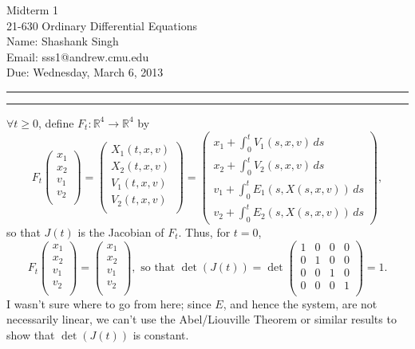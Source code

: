 \documentclass[11pt]{article}
\makeatletter
\newcounter{questionCounter}
\newcounter{partCounter}[questionCounter]
\newenvironment{question}[2][\arabic{questionCounter}]{%
    \setcounter{partCounter}{0}%
    \vspace{.25in} \hrule \vspace{0.5em}%
        \noindent{\bf #2}%
    \vspace{0.8em} \hrule \vspace{.10in}%
    \addtocounter{questionCounter}{1}%
}{}
\newcommand{\myname}{Shashank Singh}
\newcommand{\myandrew}{sss1@andrew.cmu.edu}
\newcommand{\myclass}{21-630 Ordinary Differential Equations}
\newcommand{\myhwnum}{1}
\newcommand{\duedate}{Wednesday, March 6, 2013}
\newcommand{\R}{\mathbb{R}} %
\makeatother
\begin{document}
\thispagestyle{plain}

{\Large Midterm \myhwnum} \\
\myclass \\
Name: \myname \\
Email: \myandrew \\
Due: \duedate

\begin{question}{Problem 1}
$\forall t \geq 0$, define $F_t : \R^4 \rightarrow \R^4$ by
\[F_t
    \begin{pmatrix}
        x_1 \\
        x_2 \\
        v_1 \\
        v_2 \\
    \end{pmatrix}
 =
    \begin{pmatrix}
        X_1(t,x,v) \\
        X_2(t,x,v) \\
        V_1(t,x,v) \\
        V_2(t,x,v) \\
    \end{pmatrix}
 =
    \begin{pmatrix}
x_1 + \int_0^t V_1(s,x,v) \, ds \\
x_2 + \int_0^t V_2(s,x,v) \, ds \\
v_1 + \int_0^t E_1(s,X(s,x,v)) \, ds \\
v_2 + \int_0^t E_2(s,X(s,x,v)) \, ds
    \end{pmatrix},
\]
so that $J(t)$ is the Jacobian of $F_t$. Thus, for $t = 0$,
\[
F_t
    \begin{pmatrix}
        x_1 \\
        x_2 \\
        v_1 \\
        v_2 \\
    \end{pmatrix}
 =
    \begin{pmatrix}
        x_1 \\
        x_2 \\
        v_1 \\
        v_2 \\
    \end{pmatrix},
\mbox{ so that }
\det(J(t)) = \det
    \begin{pmatrix}
        1 & 0 & 0 & 0 \\
        0 & 1 & 0 & 0 \\
        0 & 0 & 1 & 0 \\
        0 & 0 & 0 & 1 \\
    \end{pmatrix}
 = 1
.\]
I wasn't sure where to go from here; since $E$, and hence the system, are not
necessarily linear, we can't use the Abel/Liouville Theorem or similar
results to show that $\det(J(t))$ is constant.
\end{question}
\end{document}

